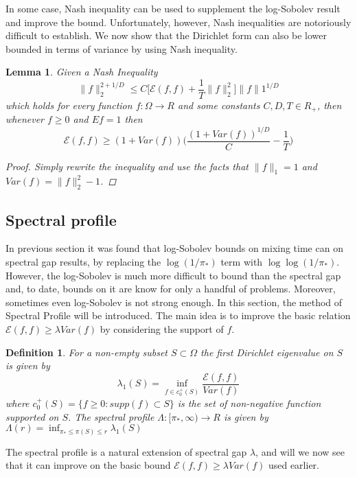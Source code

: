\documentclass[12pt,reqno]{amsart}
\newtheorem{lem}[thm]{Lemma}
\newtheorem{definition}[thm]{Definition}
{ \theoremstyle{remark}\newtheorem*{remark}{Remark} }
\begin{document}
In some case, Nash inequality can be used to supplement the log-Sobolev result and improve the bound. Unfortunately, however, Nash inequalities are notoriously difficult to establish. We now show that the Dirichlet form can also be lower bounded in terms of variance by using Nash inequality.

\begin{lem}
  Given a Nash Inequality
$$
\|f\|_2^{2+1/D} \leq C \bigg [ \mathcal{E}(f,f)+\frac{1}{T}\|f\|_2^2 \bigg] \|f\|1^{1/D}
$$
which holds for every function $f: \Omega \rightarrow R$ and some constants $C,D,T\in R_+$, then whenever $f\geq 0$ and $Ef=1$ then
$$
\mathcal{E}(f,f) \geq (1 + Var(f)) \bigg ( \frac{(1+Var(f))^{1/D}}{C} - \frac{1}{T} \bigg )
$$
\begin{proof}
  Simply rewrite the inequality and use the facts that $\|f\|_1 = 1$ and  $Var(f) = \|f\|_2^2-1$.
\end{proof}
\end{lem}

\subsection{Spectral profile}
In previous section it was found that log-Sobolev bounds on mixing time can on spectral gap results, by replacing the $\log(1/\pi_*)$ term with $\log\log(1/\pi_*)$. However, the log-Sobolev is much more difficult to bound than the spectral gap and, to date, bounds on it are know for only a handful of problems. Moreover, sometimes even log-Sobolev is not strong enough. In this section, the method of Spectral Profile will be introduced. The main idea is to improve the basic relation $\mathcal{E}(f,f)\geq \lambda Var(f)$ by considering the support of $f$.

\begin{definition}
  For a non-empty subset $S \subset \Omega$ the first Dirichlet eigenvalue on $S$ is given by
  \begin{equation}
    \label{eq:spectral_profile}
    \lambda_1 (S) = \inf_{f\in c_0^+(S)}\frac{\mathcal{E}(f,f)}{Var(f)}
  \end{equation}
where $c_0^+(S) = \{f\geq 0: supp (f)\subset S\}$ is the set of non-negative function supported on $S$. The spectral profile $\Lambda : [\pi_*,\infty)\rightarrow R$ is given by
$\Lambda (r) = \inf_{\pi_*\leq \pi(S) \leq r}\lambda_1 (S)$
\end{definition}

The spectral profile is a natural extension of spectral gap $\lambda$, and will we now see that it can improve on the basic bound $\mathcal{E}(f,f)\geq \lambda Var(f)$ used earlier.
\end{document}
